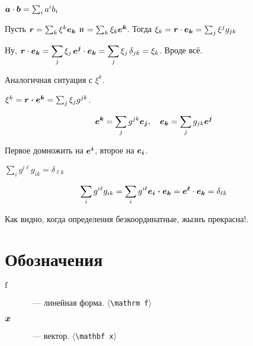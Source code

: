 \documentclass[timbord]{longnotes}
\begin{document}
\begin{prop}
  $\v a\cdot \v b = \sum_i a^i b_i$
\end{prop}

\begin{prop}
  Пусть $\v r = \sum_k \xi^k \v {e_k}$ и $=\sum_k\xi_k \v{e^k}$.
  Тогда $\xi_k = \v r \cdot \v{e_k} = \sum_j \xi^j g_{jk}$
\end{prop}
\begin{lproof}
  Ну, $\v{r} \cdot \v{e_k} = \dsum_j \xi_j \, \v{e^j}\cdot \v{e_k} 
  = \sum_j \xi_j \,\delta_{jk} = \xi_k$. Вроде всё.
\end{lproof}

Аналогичная ситуация с $\xi^k$.
\begin{prop}
  $\xi^k = \v{r\cdot e^k} = \sum_j \xi_j g^{jk}$.
\end{prop}

\begin{prop}
\[
  \v{e^k} = \sum_j g^{jk} \v{e_j}, \quad \v{e_k} = \sum_j g_{jk} \v{e^j}
\]
\begin{lproof}
  Первое домножить на $\v{e^i}$, второе на $\v{e_i}$.
\end{lproof}
\end{prop}
\begin{prop}
  $\sum_{i} g^{i\ell}g_{ik} = \delta_{\ell k}$
\end{prop}
\begin{lproof}
  \[
    \sum_{i} g^{i\ell}g_{ik} = \sum_i g^{i\ell} \v{e_i \cdot e_k} = \v{e^\ell}\cdot \v{e_k} =
    \delta_{\ell k}
  \]  
\end{lproof}


Как видно, когда определения безкоординатные, жызнъ прекрасна!. 
\appendix
\chapter{Обозначения}
\begin{description}
  \item[$\v*{f}$]~--- линейная форма. \hfill$\langle$\verb+\mathrm f+$\rangle$
  \item[$\v{x}$]~--- вектор. \hfill$\langle$\verb+\mathbf x+$\rangle$
\end{description}
\end{document}
